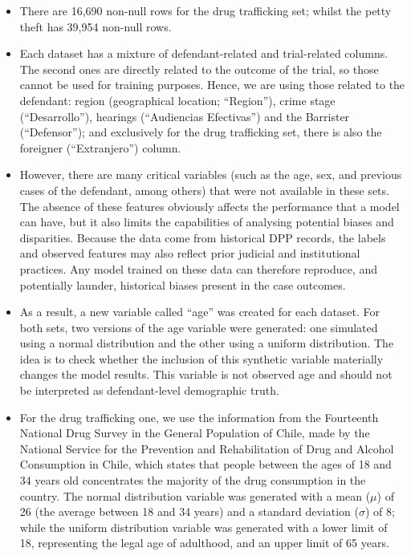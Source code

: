 \documentclass[fleqn,10pt]{wlscirep}
\begin{document}
    \begin{itemize}
        \item There are 16,690 non-null rows for the drug trafficking set; whilst the petty theft has 39,954 non-null rows.
        
        \item Each dataset has a mixture of defendant-related and trial-related columns. The second ones are directly related to the outcome of the trial, so those cannot be used for training purposes. Hence, we are using those related to the defendant: region (geographical location; ``Region''), crime stage (``Desarrollo''), hearings (``Audiencias Efectivas'') and the Barrister (``Defensor''); and exclusively for the drug trafficking set, there is also the foreigner (``Extranjero'') column.  
        
        \item However, there are many critical variables (such as the age, sex, and previous cases of the defendant, among others) that were not available in these sets. The absence of these features obviously affects the performance that a model can have, but it also limits the capabilities of analysing potential biases and disparities. Because the data come from historical DPP records, the labels and observed features may also reflect prior judicial and institutional practices. Any model trained on these data can therefore reproduce, and potentially launder, historical biases present in the case outcomes.
        
        \item As a result, a new variable called ``age'' was created for each dataset. For both sets, two versions of the age variable were generated: one simulated using a normal distribution and the other using a uniform distribution. The idea is to check whether the inclusion of this synthetic variable materially changes the model results. This variable is not observed age and should not be interpreted as defendant-level demographic truth.
        
        \item For the drug trafficking one, we use the information from the Fourteenth National Drug Survey in the General Population of Chile, made by the National Service for the Prevention and Rehabilitation of Drug and Alcohol Consumption \cite{EstudioPG2020} in Chile, which states that people between the ages of 18 and 34 years old concentrates the majority of the drug consumption in the country. The normal distribution variable was generated with a mean ($\mu$) of 26 (the average between 18 and 34 years) and a standard deviation ($\sigma$) of 8; while the uniform distribution variable was generated with a lower limit of 18, representing the legal age of adulthood, and an upper limit of 65 years. 
        

\end{itemize}
\end{document}
